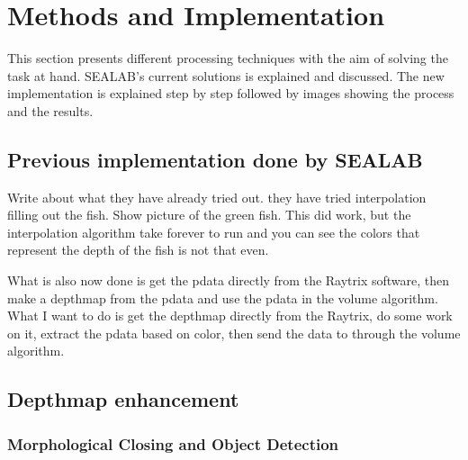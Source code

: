 \section{Methods and Implementation}\label{methods and implementation}

This section presents different processing techniques with the aim of solving the task at hand. SEALAB's current solutions is explained and discussed. The new implementation is explained step by step followed by images showing the process and the results.


\subsection{Previous implementation done by SEALAB}

{\color{red}
Write about what they have already tried out. 
they have tried interpolation filling out the fish. Show picture of the green fish. 
This did work, but the interpolation algorithm take forever to run and you can see the colors that represent the depth of the fish is not that even.

What is also now done is get the pdata directly from the Raytrix software, then make a depthmap from the pdata and use the pdata in the volume algorithm. What I want to do is get the depthmap directly from the Raytrix, do some work on it, extract the pdata based on color, then send the data to through the volume algorithm. 
}



\subsection{Depthmap enhancement} \label{section:depthmap}

\subsubsection{Morphological Closing and Object Detection}

